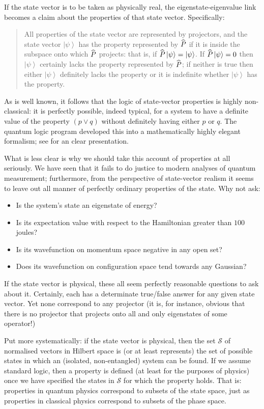 \documentclass[12pt]{article}
\newcommand{\mc}[1]{\ensuremath{\mathcal{#1}}}
\newcommand{\ket}[1]{\ensuremath{\left|  #1 \right\rangle}}
\newcommand{\op}[1]{\ensuremath{\widehat{\textsf{\ensuremath{#1}}}}}
\begin{document}
If the state vector is to be taken as physically real, the eigenstate-eigenvalue link becomes a claim about the properties of that state vector. Specifically: 
\begin{quote}All properties of the state vector are represented by projectors, and the state vector \ket{\psi} has the property represented by \op{P} if it is inside the subspace onto which \op{P} projects: that is, if $\op{P}\ket{\psi}=\ket{\psi}$. If $\op{P}\ket{\psi}=0$ then \ket{\psi} certainly lacks the property represented by \op{P}; if neither is true then either \ket{\psi} definitely lacks the property or it is indefinite whether \ket{\psi} has the property.
\end{quote}
As is well known, it follows that the logic of state-vector properties is highly non-classical: it is perfectly possible, indeed typical, for a system to have a definite value of the property $(p \vee q)$ without definitely having either $p$ or $q$. The quantum logic program developed this into a mathematically highly elegant formalism; see  for an clear presentation.

What is less clear is why we should take this account of properties at all seriously. We have seen that it fails to do justice to modern analyses of quantum measurement; furthermore, from the perspective of state-vector realism it seems to leave out all manner of perfectly ordinary properties of the state. Why not ask:
\begin{itemize}
\item Is the system's state an eigenstate of energy?
\item Is its expectation value with respect to the Hamiltonian greater than $100$ joules?
\item Is its wavefunction on momentum space negative in any open set?
\item Does its wavefunction on configuration space tend towards any Gaussian?
\end{itemize}
If the state vector is physical, these all seem perfectly reasonable questions to ask about it. Certainly, each has a determinate true/false answer for any given state vector. Yet none correspond to any projector (it is, for instance, obvious that there is no projector that projects onto all and only eigenstates of some operator!)

Put more systematically: if the state vector is physical, then the set \mc{S} of normalised vectors in Hilbert space is (or at least represents) the set of possible states in which an (isolated, non-entangled) system can be found. If we assume standard logic, then a property is defined (at least for the purposes of physics) once we have specified the states in \mc{S} for which the property holds. That is: properties in quantum physics correspond to subsets of the state space, just as properties in classical physics correspond to subsets of the phase space. 
\end{document}
